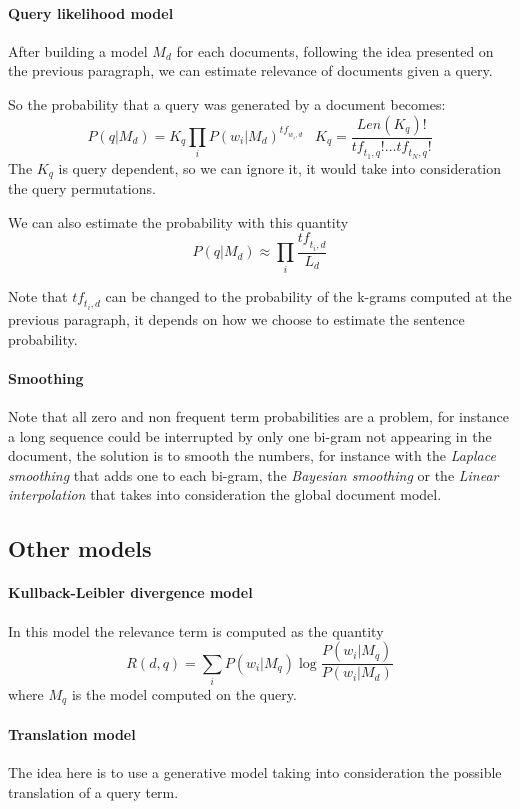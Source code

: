 \paragraph{Query likelihood model}
After building a model $M_d$ for each documents, following the idea presented on the previous paragraph, 
we can estimate relevance of documents given a query. 

So the probability that a query was generated by a document becomes:
$$P(q|M_d) = K_q\prod_iP(w_i|M_d)^{\mathit{tf}_{w_i, d}}\;\;\; 
K_q = \frac{\mathit{Len}(K_q)!}{\mathit{tf}_{t_1, q}! \dots \mathit{tf}_{t_N, q}!}$$
The $K_q$ is query dependent, so we can ignore it, it would take into consideration 
the query permutations.

We can also estimate the probability with this quantity 
$$P(q|M_d) \approx \prod_i\frac{\mathit{tf}_{t_i, d}}{L_d}$$

Note that $\mathit{tf}_{t_i, d}$ can be changed to the probability of the 
k-grams computed at the previous paragraph, it depends on how we choose to 
estimate the sentence probability.

\paragraph{Smoothing}
Note that all zero and non frequent term probabilities are a problem, 
for instance a long sequence could be interrupted by only one bi-gram not appearing in 
the document, the solution
is to smooth the numbers, for instance with the \emph{Laplace smoothing} that adds 
one to each bi-gram, the \emph{Bayesian smoothing} or the \emph{Linear interpolation} that 
takes into consideration the global document model.

\subsection{Other models}
\paragraph{Kullback-Leibler divergence model}
In this model the relevance term is computed as the quantity 
$$R(d, q) = \sum_i P(w_i|M_q)\log\frac{P(w_i|M_q)}{P(w_i|M_d)}$$
where $M_q$ is the model computed on the query.

\paragraph{Translation model}
The idea here is to use a generative model taking into consideration 
the possible translation of a query term.